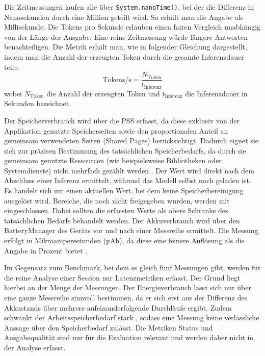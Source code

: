 \noindent Die Zeitmessungen laufen alle über \texttt{System.nanoTime()}, bei der die Differenz in Nanosekunden durch eine Million geteilt wird. So erhält man die Angabe als Millisekunde.
Die Tokens pro Sekunde erlauben einen fairen Vergleich unabhängig von der Länge der Ausgabe. Eine reine Zeitmessung würde längere Antworten benachteiligen. Die Metrik erhält man, wie in folgender Gleichung dargestellt, indem man die Anzahl der erzeugten Token durch die gesamte Inferenzdauer teilt:
\begin{equation}
    \text{Tokens/s} = \frac{N_{\text{Token}}}{t_{\text{Inferenz}}}
\end{equation}
wobei $N_{\text{Token}}$ die Anzahl der erzeugten Token und $t_{\text{Inferenz}}$ die Inferenzdauer in Sekunden bezeichnet.
\vspace{\baselineskip}

\noindent Der Speicherverbrauch wird über die \ac{PSS} erfasst, da diese exklusiv von der Applikation genutzte Speicherseiten sowie den proportionalen Anteil an gemeinsam verwendeten Seiten (Shared Pages) berücksichtigt.
Dadurch eignet sie sich zur präzisen Bestimmung des tatsächlichen Speicherbedarfs, da durch sie gemeinsam genutzte Ressourcen (wie beispielsweise Bibliotheken oder Systemdienste) nicht mehrfach gezählt werden \autocite{android_memory}. Der Wert wird direkt nach dem Abschluss einer Inferenz ermittelt, während das Modell selbst noch geladen ist. Es handelt sich um einen aktuellen Wert, bei dem keine Speicherbereinigung ausgelöst wird. Bereiche, die noch nicht freigegeben wurden, werden mit eingeschlossen. Dabei sollten die erfassten Werte als obere Schranke des tatsächlichen Bedarfs behandelt werden.
Der Akkuverbrauch wird über den BatteryManager des Geräts vor und nach einer Messreihe ermittelt. Die Messung erfolgt in Mikroamperestunden (µAh), da diese eine feinere Auflösung als die Angabe in Prozent bietet \autocite{android_batterymanager}.
\vspace{\baselineskip}

\noindent Im Gegensatz zum Benchmark, bei dem es gleich fünf Messungen gibt, werden für die reine Analyse einer Session nur Latenzmetriken erfasst. Der Grund liegt hierbei an der Menge der Messungen. Der Energieverbrauch lässt sich nur über eine ganze Messreihe sinnvoll bestimmen, da er sich erst aus der Differenz des Akkustands über mehrere aufeinanderfolgende Durchläufe ergibt. Zudem schwankt der Arbeitsspeicherbedarf stark \autocite{android_memory}, sodass eine Messung keine verlässliche Aussage über den Speicherbedarf zulässt. Die Metriken Status und Ausgabequalität sind nur für die Evaluation relevant und werden daher nicht in der Analyse erfasst.
\vspace{\baselineskip}

